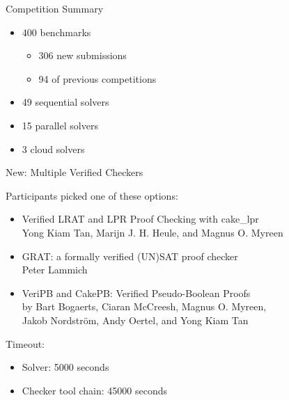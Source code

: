 \documentclass{beamer}
\begin{document}
\begin{frame}{Competition Summary}

\begin{itemize}
  \item 400 benchmarks
  \begin{itemize}
  \item 306 new submissions
  \item 94 of previous competitions
  \end{itemize}
  \item 49 sequential solvers
  \item 15 parallel solvers
  \item 3 cloud solvers
\end{itemize}

\end{frame}

\begin{frame}{New: Multiple Verified Checkers}

Participants picked one of these options:
\begin{itemize}
\item Verified LRAT and LPR Proof Checking with cake\_lpr
\\Yong Kiam Tan, Marijn J. H. Heule, and Magnus O. Myreen
\item GRAT: a formally verified (UN)SAT proof checker\\
Peter Lammich
\item VeriPB and CakePB: Verified Pseudo-Boolean Proofs\\
by Bart Bogaerts, Ciaran McCreesh, Magnus O. Myreen,\\Jakob Nordström, Andy Oertel, and Yong Kiam Tan
\end{itemize}

\bigskip

Timeout:
\begin{itemize}
\item Solver: 5000 seconds
\item Checker tool chain: 45000 seconds
\end{itemize}

\end{frame}
\end{document}
